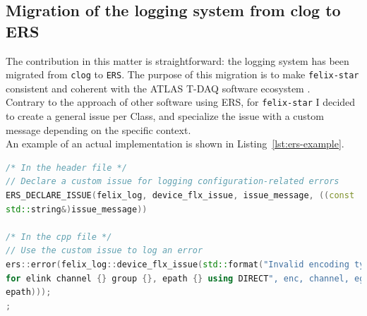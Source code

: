 \subsection{Migration of the logging system from clog to ERS}

The contribution in this matter is straightforward: the logging system has been migrated from \texttt{clog} to \texttt{ERS}. The purpose of this migration is to make \texttt{felix-star} consistent and coherent with the \acs{ATLAS} \acs{T-DAQ} software ecosystem \cite{felix-star-clog-to-ers}.\\
Contrary to the approach of other software using ERS, for \texttt{felix-star} I decided to create a general issue per Class, and specialize the issue with a custom message depending on the specific context.\\
An example of an actual implementation is shown in Listing~\ref{lst:ers-example}.

\begin{lstlisting}[language=C++, caption={Example of ERS custom issue declaration and usage.}, label={lst:ers-example}]
/* In the header file */
// Declare a custom issue for logging configuration-related errors
ERS_DECLARE_ISSUE(felix_log, device_flx_issue, issue_message, ((const
std::string&)issue_message))

/* In the cpp file */
// Use the custom issue to log an error
ers::error(felix_log::device_flx_issue(std::format("Invalid encoding type {}
for elink channel {} group {}, epath {} using DIRECT", enc, channel, egroup,
epath)));
;
\end{lstlisting}